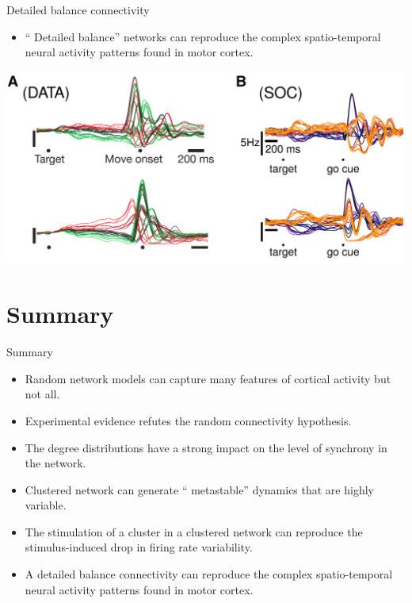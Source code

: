 \documentclass[fleqn]{beamer}
\newcommand{\curldoquom}[1]{\textquotedblleft
#1\textquotedblright\hspace{.01mm}}
\newcommand{\pc}[1]{\setcounter{page}{#1}}
\newcommand{\ppc}[1]{\pause\setcounter{page}{#1}}
\begin{document}
\begin{frame}{Detailed balance connectivity}
 \begin{itemize}
  \item \curldoquom{Detailed balance} networks can reproduce the complex
spatio-temporal neural activity patterns found in motor cortex.
 \end{itemize}\ppc{17}
\begin{center}
   \includegraphics[width=.8\textwidth]{figures/hennequin3}
\end{center}
  \begin{flushright}
  {\footnotesize \cite{Hennequin2014}}
\end{flushright}
\end{frame}

\section{Summary}

\begin{frame}{Summary}

\pc{18}
\begin{itemize}
  \item Random network models can capture many features of cortical activity but
not all.\ppc{18}
  \item Experimental evidence refutes the random connectivity
hypothesis.\ppc{18}
  \item The degree distributions have a strong impact on the level of
synchrony in the network.\ppc{18}
  \item Clustered network can generate \curldoquom{metastable} dynamics that are
highly variable.\ppc{18}
  \item The stimulation of a cluster in a clustered network can reproduce the
stimulus-induced drop in firing rate variability.\ppc{18}
\item A detailed balance connectivity can reproduce the complex
spatio-temporal neural activity patterns found in motor cortex.
\end{itemize}
\end{frame}
\end{document}
